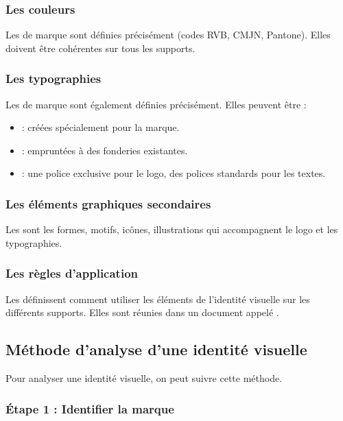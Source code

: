 \subsubsection{Les couleurs}

Les  de marque sont définies précisément (codes RVB, CMJN, Pantone). Elles doivent être cohérentes sur tous les supports.

\subsubsection{Les typographies}

Les  de marque sont également définies précisément. Elles peuvent être :

\begin{itemize}
    \item {} : créées spécialement pour la marque.
    \item {} : empruntées à des fonderies existantes.
    \item {} : une police exclusive pour le logo, des polices standards pour les textes.
\end{itemize}

\subsubsection{Les éléments graphiques secondaires}

Les  sont les formes, motifs, icônes, illustrations qui accompagnent le logo et les typographies.

\subsubsection{Les règles d'application}

Les  définissent comment utiliser les éléments de l'identité visuelle sur les différents supports. Elles sont réunies dans un document appelé .

\subsection{Méthode d'analyse d'une identité visuelle}

Pour analyser une identité visuelle, on peut suivre cette méthode.

\subsubsection{Étape 1 : Identifier la marque}

